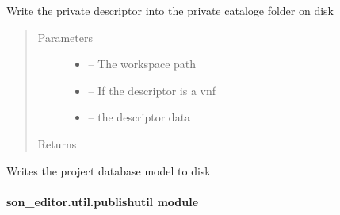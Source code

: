 \documentclass[letterpaper,10pt,english]{sphinxmanual}
\begin{document}

\begin{fulllineitems}
\label{_source/son_editor.util:son_editor.util.descriptorutil.write_private_descriptor}
Write the private descriptor into the private cataloge folder on disk
\begin{quote}\begin{description}
\item[{Parameters}] \leavevmode\begin{itemize}
\item {} 
 -- The workspace path

\item {} 
 -- If the descriptor is a vnf

\item {} 
 -- the descriptor data

\end{itemize}

\item[{Returns}] \leavevmode


\end{description}\end{quote}

\end{fulllineitems}


\begin{fulllineitems}
\label{_source/son_editor.util:son_editor.util.descriptorutil.write_project_descriptor}
Writes the project database model to disk

\end{fulllineitems}



\paragraph{son\_editor.util.publishutil module}
\label{_source/son_editor.util:module-son_editor.util.publishutil}\label{_source/son_editor.util:son-editor-util-publishutil-module}
\end{document}
